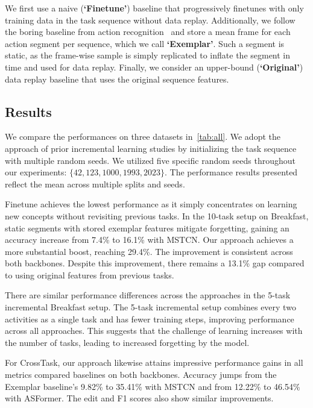 We first use a naive (\textbf{`Finetune'}) baseline that progressively finetunes with only training data in the task sequence without data replay. Additionally, we follow the boring baseline from action recognition~\cite{alssum2023just} and store a mean frame for each action segment per sequence, which we call \textbf{`Exemplar'}. Such a segment is static, as the frame-wise sample is simply replicated to inflate the segment in time and used for data replay. Finally, we consider an upper-bound (\textbf{`Original'}) data replay baseline that uses the original sequence features. 

\subsection{Results}



We compare the performances on three datasets in~\cref{tab:all}. We adopt the approach of prior incremental learning studies by initializing the task sequence with multiple random seeds. We utilized five specific random seeds throughout our experiments: $\{42, 123, 1000, 1993, 2023\}$. The performance results presented reflect the mean across multiple splits and seeds.

Finetune achieves the lowest performance as it simply concentrates on learning new concepts without revisiting previous tasks. In the 10-task setup on Breakfast, static segments with stored exemplar features mitigate forgetting, gaining an accuracy increase from 7.4\% to 16.1\% with MSTCN. Our approach achieves a more substantial boost, reaching 29.4\%. The improvement is consistent across both backbones. Despite this improvement, there remains a 13.1\% gap compared to using original features from previous tasks.

There are similar performance differences across the approaches in the 5-task incremental Breakfast setup. The 5-task incremental setup combines every two activities as a single task and has fewer training steps, improving performance across all approaches. This suggests that the challenge of learning increases with the number of tasks, leading to increased forgetting by the model. 

For CrossTask, our approach likewise attains impressive performance gains in all metrics compared baselines on both backbones. Accuracy jumps from the Exemplar baseline's 9.82\% to 35.41\% with MSTCN and from 12.22\% to 46.54\% with ASFormer. The edit and F1 scores also show similar improvements.

